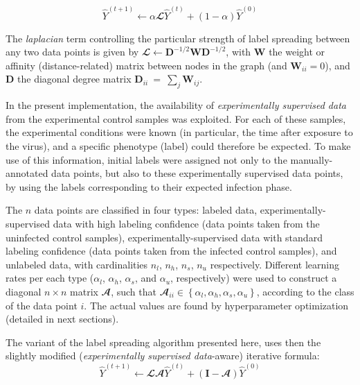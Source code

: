 \documentclass[oneside, a4paper, draft]{memoir} %
\begin{document}
\begin{equation}
	\label{eq:zhou}
	\hat{Y}^{(t+1)} \leftarrow \alpha \mathbfcal{L}\hat{Y}^{(t)} + (1-\alpha)\hat{Y}^{(0)}
\end{equation}

The \emph{laplacian} term controlling the particular
strength of label spreading between any two data points is given by
$\mathbfcal{L} \leftarrow \mathbf{D}^{-1/2}\mathbf{W}\mathbf{D}^{-1/2}$, with $\mathbf{W}$ the
weight or affinity (distance-related) matrix between nodes in the graph (and $\mathbf{W}_{ii} = 0$), and
$\mathbf{D}$ the diagonal degree matrix $\mathbf{D}_{ii}~=~\sum_{j}{\mathbf{W}_{ij}}$. 

In the present implementation, the availability of \emph{experimentally supervised data} from the experimental control
samples was exploited. For each of these samples, the experimental conditions were known (in particular, the time after
exposure to the virus), and a specific phenotype (label) could therefore be expected. To make use of this information,
initial labels were assigned not only to the manually-annotated data points, but also to these experimentally
supervised data points, by using the labels corresponding to their expected infection phase.

The $n$ data points are classified in four types: labeled data,
experimentally-supervised data with high labeling confidence (data points taken from the uninfected control samples), 
experimentally-supervised data with standard labeling confidence (data points taken from the infected control
samples), and unlabeled data, with cardinalities $n_l$, $n_h$, $n_s$, $n_u$ respectively. Different learning rates
per each type ($\alpha_l$, $\alpha_h$, $\alpha_s$, and $\alpha_u$, respectively) were used to construct a diagonal
$n \times n$ matrix $\mathbfcal{A}$, such that $\mathbfcal{A}_{ii} \in \left\{ \alpha_l, \alpha_h, \alpha_s,
\alpha_u \right\}$, according to the class of the data point $i$. The actual values are found by hyperparameter
optimization (detailed in next sections).

The variant of the label spreading algorithm presented here, uses then the slightly modified (\emph{experimentally
supervised data}-aware) iterative formula:
\begin{equation}
	\hat{Y}^{(t+1)} \leftarrow \mathbfcal{LA}\hat{Y}^{(t)} + (\mathbf{I}-\mathbfcal{A})\hat{Y}^{(0)}
\end{equation}
\end{document}

